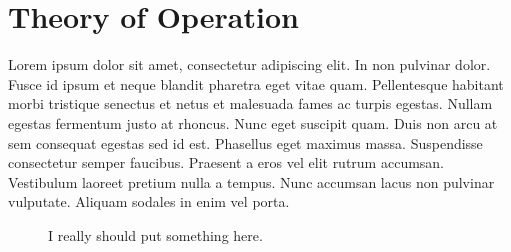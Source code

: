 \section{Theory of Operation}\label{sec:20-theory}
Lorem ipsum dolor sit amet, consectetur adipiscing elit. In non pulvinar dolor. Fusce id ipsum et neque blandit pharetra eget vitae quam. Pellentesque habitant morbi tristique senectus et netus et malesuada fames ac turpis egestas. Nullam egestas fermentum justo at rhoncus. Nunc eget suscipit quam. Duis non arcu at sem consequat egestas sed id est. Phasellus eget maximus massa. Suspendisse consectetur semper faucibus. Praesent a eros vel elit rutrum accumsan. Vestibulum laoreet pretium nulla a tempus. Nunc accumsan lacus non pulvinar vulputate. Aliquam sodales in enim vel porta.

\begin{figure}[t]
	\centering
	\caption{I really should put something here.}
	\label{fig:theory_csamp_schematic}
\end{figure}%
%
